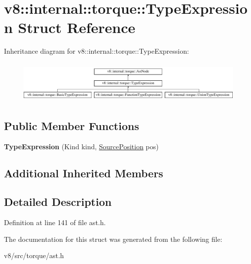 \hypertarget{structv8_1_1internal_1_1torque_1_1TypeExpression}{}\section{v8\+:\+:internal\+:\+:torque\+:\+:Type\+Expression Struct Reference}
\label{structv8_1_1internal_1_1torque_1_1TypeExpression}
Inheritance diagram for v8\+:\+:internal\+:\+:torque\+:\+:Type\+Expression\+:\begin{figure}[H]
\begin{center}
\leavevmode
\includegraphics[height=2.089552cm]{structv8_1_1internal_1_1torque_1_1TypeExpression}
\end{center}
\end{figure}
\subsection*{Public Member Functions}
\begin{DoxyCompactItemize}
\item 
\mbox{\label{structv8_1_1internal_1_1torque_1_1TypeExpression_adf2351b6f30a371a91cf1d89bc2a109c}} 
{\bfseries Type\+Expression} (Kind kind, \mbox{\hyperlink{structv8_1_1internal_1_1torque_1_1SourcePosition}{Source\+Position}} pos)
\end{DoxyCompactItemize}
\subsection*{Additional Inherited Members}


\subsection{Detailed Description}


Definition at line 141 of file ast.\+h.



The documentation for this struct was generated from the following file\+:\begin{DoxyCompactItemize}
\item 
v8/src/torque/ast.\+h\end{DoxyCompactItemize}
